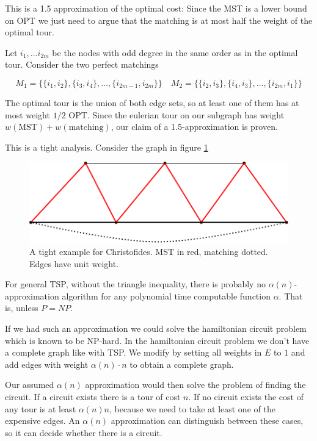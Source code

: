 This is a 1.5 approximation of the optimal cost: Since the MST is a lower bound on OPT we just need to argue that the matching is at most half the weight of the optimal tour.

Let $i_1,\ldots i_{2m}$ be the nodes with odd degree in the same order as in the optimal tour. Consider the two perfect matchings

\[M_1 = \{\{i_1,i_2\},\{i_3,i_4\},\ldots, \{i_{2m-1},i_{2m}\}\} \quad M_2=\{\{i_2,i_3\},\{i_4,i_3\}, \ldots, \{i_{2m},i_1\}\}\]

The optimal tour is the union of both edge sets, so at least one of them has at most weight $1/2$ OPT. Since the eulerian tour on our subgraph has weight $w(\text{MST})+w(\text{matching})$, our claim of a 1.5-approximation is proven.

This is a tight analysis. Consider the graph in figure \ref{Fig:christofidesTight}

\begin{figure}[hbt]
\begin{center}
\includegraphics{./images/christofides}
\end{center}
\caption{A tight example for Christofides. MST in red, matching dotted. Edges have unit weight.}
\label{Fig:christofidesTight}
\end{figure}

For general TSP, without the triangle inequality, there is probably no $\alpha(n)$-approximation algorithm for any polynomial time computable function $\alpha$. That is, unless $P=NP$.

If we had such an approximation we could solve the hamiltonian circuit problem which is known to be NP-hard. In the hamiltonian circuit problem we don't have a complete graph like with TSP. We modify by setting all weights in $E$ to $1$ and add edges with weight $\alpha(n)\cdot n$ to obtain a complete graph.

Our assumed $\alpha(n)$ approximation would then solve the problem of finding the circuit. If a circuit exists there is a tour of cost $n$. If no circuit exists the cost of any tour is at least $\alpha(n)n$, because we need to take at least one of the expensive edges. An $\alpha(n)$ approximation can distinguish between these cases, so it can decide whether there is a circuit.

